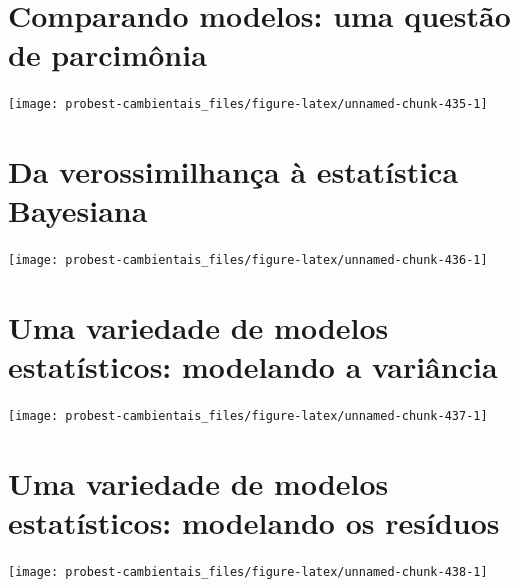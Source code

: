 \documentclass[
]{book}
\begin{document}
\hypertarget{aic}{%
\chapter{Comparando modelos: uma questão de parcimônia}\label{aic}}

\begin{center}\texttt{[image: probest-cambientais\_files/figure-latex/unnamed-chunk-435-1]} \end{center}

\hypertarget{statbayes}{%
\chapter{Da verossimilhança à estatística Bayesiana}\label{statbayes}}

\begin{center}\texttt{[image: probest-cambientais\_files/figure-latex/unnamed-chunk-436-1]} \end{center}

\hypertarget{varmodels}{%
\chapter{Uma variedade de modelos estatísticos: modelando a variância}\label{varmodels}}

\begin{center}\texttt{[image: probest-cambientais\_files/figure-latex/unnamed-chunk-437-1]} \end{center}

\hypertarget{nindep}{%
\chapter{Uma variedade de modelos estatísticos: modelando os resíduos}\label{nindep}}

\begin{center}\texttt{[image: probest-cambientais\_files/figure-latex/unnamed-chunk-438-1]} \end{center}

  
\end{document}
